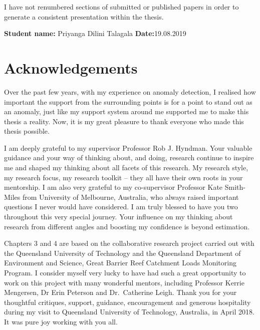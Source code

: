 \documentclass{monashthesis}
\theoremstyle{definition}
\theoremstyle{definition}
\theoremstyle{definition}
\theoremstyle{remark}
\begin{document}
I have not renumbered sections of submitted or published papers in order to generate a consistent presentation within the thesis.

\textbf{Student name:} Priyanga Dilini Talagala \hspace{3cm}\textbf{Date:}19.08.2019

\hypertarget{acknowledgements}{%
\chapter*{Acknowledgements}\label{acknowledgements}}

Over the past few years, with my experience on anomaly detection, I realised how important the support from the surrounding points is for a point to stand out as an anomaly, just like my support system around me supported me to make this thesis a reality. Now, it is my great pleasure to thank everyone who made this thesis possible.

I am deeply grateful to my supervisor Professor Rob J. Hyndman. Your valuable guidance and your way of thinking about, and doing, research continue to inspire me and shaped my thinking about all facets of this research. My research style, my research focus, my research toolkit -- they all have their own roots in your mentorship. I am also very grateful to my co-supervisor Professor Kate Smith-Miles from University of Melbourne, Australia, who always raised important questions I never would have considered. I am truly blessed to have you two throughout this very special journey. Your influence on my thinking about research from different angles and boosting my confidence is beyond estimation.

Chapters 3 and 4 are based on the collaborative research project carried out with the Queensland University of Technology and the Queensland Department of Environment and Science, Great Barrier Reef Catchment Loads Monitoring Program. I consider myself very lucky to have had such a great opportunity to work on this project with many wonderful mentors, including Professor Kerrie Mengersen, Dr Erin Peterson and Dr.~Catherine Leigh. Thank you for your thoughtful critiques, support, guidance, encouragement and generous hospitality during my visit to Queensland University of Technology, Australia, in April 2018. It was pure joy working with you all.
\end{document}

